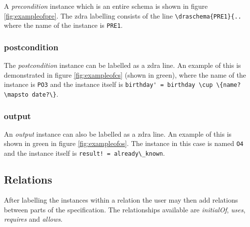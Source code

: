 A \emph{precondition} instance which is an entire schema is shown in figure \ref{fig:exampleofpre}. The \gls{zdra} labelling consists of the line \verb|\draschema{PRE1}{..| where the name of the instance is \verb|PRE1|.


\subsubsection{postcondition}

The \emph{postcondition} instance can be labelled as a \gls{zdra} line. An example of this is demonstrated in figure \ref{fig:exampleofcs} (shown in green), where the name of the instance is \verb|PO3| and the instance itself is \verb|birthday' = birthday \cup \{name? \mapsto date?\}|.

\subsubsection{output}

An \emph{output} instance can also be labelled as a \gls{zdra} line. An example of this is shown in green in figure \ref{fig:exampleofos}. The instance in this case is named \verb|O4| and the instance itself is \verb|result! = already\_known|.

\subsection{Relations}
\label{subsec:zdrarelations}

After labelling the instances within a relation the user may then add relations between parts of the specification. The relationships available are \emph{initialOf}, \emph{uses}, \emph{requires} and \emph{allows}.

